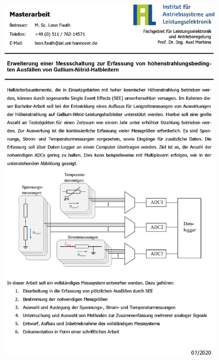 \begin{figure}[h]
	\centering
	\includegraphics[scale=0.9]{grafiken/MA_Messsystem.eps}
\end{figure}
